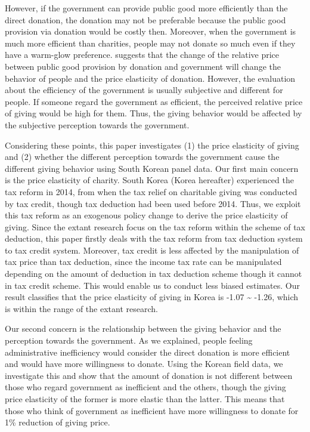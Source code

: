 \documentclass[ review  , 3p ]{elsarticle}
\begin{document}
  However, if the government can provide public good more efficiently than the direct donation, the donation may not be preferable because the public good provision via donation would be costly then.
  Moreover, when the government is much more efficient than charities, people may not donate so much even if they have a warm-glow preference. \cite{Saez2004} suggests that the change of the relative price between public good provision by donation and government will change the behavior of people and the price elasticity of donation.
  However, the evaluation about the efficiency of the government is usually subjective and different for people. If someone regard the government as efficient, the perceived relative price of giving would be high for them. Thus, the giving behavior would be affected by the subjective perception towards the government.
  
  Considering these points, this paper investigates (1) the price elasticity of giving and (2) whether the different perception towards the government cause the different giving behavior using South Korean panel data.
  Our first main concern is the price elasticity of charity. South Korea (Korea hereafter) experienced the tax reform in 2014, from when the tax relief on charitable giving was conducted by tax credit, though tax deduction had been used before 2014. Thus, we exploit this tax reform as an exogenous policy change to derive the price elasticity of giving. Since the extant research focus on the tax reform within the scheme of tax deduction, this paper firstly deals with the tax reform from tax deduction system to tax credit system. Moreover, tax credit is less affected by the manipulation of tax price than tax deduction, since the income tax rate can be manipulated depending on the amount of deduction in tax deduction scheme though it cannot in tax credit scheme. This would enable us to conduct less biased estimates.
  Our result classifies that the price elasticity of giving in Korea is -1.07 \textasciitilde{} -1.26, which is within the range of the extant research.
  
  Our second concern is the relationship between the giving behavior and the perception towards the government. As we explained, people feeling administrative inefficiency would consider the direct donation is more efficient and would have more willingness to donate. Using the Korean field data, we investigate this and show that the amount of donation is not different between those who regard government as inefficient and the others, though the giving price elasticity of the former is more elastic than the latter. This means that those who think of government as inefficient have more willingness to donate for 1\% reduction of giving price.
  
\end{document}
